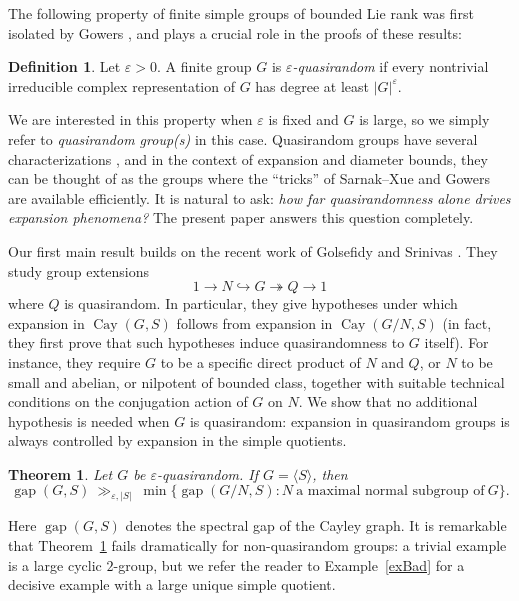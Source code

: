 \documentclass[11pt,reqno]{amsart}
\numberwithin{equation}{section}
\newtheorem{theorem}{Theorem}[section]
\theoremstyle{definition}
\newtheorem*{definition}{Definition}
\theoremstyle{remark}
\newcommand{\Cay}{\mathop{\mathrm{Cay}}}
\newcommand{\gap}{\mathop{\mathrm{gap}}}
\begin{document}
The following property of finite simple groups of bounded Lie rank was first isolated by Gowers \cite{Gow08},
and plays a crucial role in the proofs of these results:

 \begin{definition}
Let $\varepsilon>0$.
A finite group $G$ is $\varepsilon$\emph{-quasirandom} if every nontrivial irreducible complex representation of $G$
has degree at least $|G|^\varepsilon$.
\end{definition} 

We are interested in this property when $\varepsilon$ is fixed and $G$ is large,
so we simply refer to \emph{quasirandom group(s)} in this case.
Quasirandom groups have several characterizations \cite{BS25,NP11},
and in the context of expansion and diameter bounds,
they can be thought of as the groups where the ``tricks''
of Sarnak--Xue \cite{SX91} and Gowers \cite{NP11} are available efficiently.
It is natural to ask:
\emph{how far quasirandomness alone drives expansion phenomena?}
The present paper answers this question completely.

Our first main result builds on the recent work of Golsefidy and Srinivas \cite{GS24,GS25}.
They study group extensions
$$ 1 \to N \hookrightarrow G \twoheadrightarrow Q \to 1 $$
where $Q$ is quasirandom.
In particular, they give hypotheses under which expansion in $\Cay(G,S)$
follows from expansion in $\Cay(G/N,S)$
(in fact, they first prove that such hypotheses induce quasirandomness to $G$ itself).
For instance, they require $G$ to be a specific direct product of $N$ and $Q$,
or $N$ to be small and abelian, or nilpotent of bounded class,
together with suitable technical conditions on the conjugation action of $G$ on $N$.
We show that no additional hypothesis is needed when $G$ is quasirandom:
expansion in quasirandom groups is always controlled by expansion in the simple quotients.

\begin{theorem} \label{thProjection}
Let $G$ be $\varepsilon$-quasirandom.
If $G=\langle S \rangle$, then
$$ \gap(G,S) \> \gg_{\varepsilon,|S|} \> 
\min \{ \gap(G/N,S)  : N~\text{a maximal normal subgroup of}~G\} . $$
\end{theorem}

Here $\gap(G,S)$ denotes the spectral gap of the Cayley graph.
It is remarkable that Theorem~\ref{thProjection} fails dramatically for non-quasirandom groups:
a trivial example is a large cyclic $2$-group,
but we refer the reader to Example~\ref{exBad} for a decisive example with a large unique simple quotient.
\end{document}
